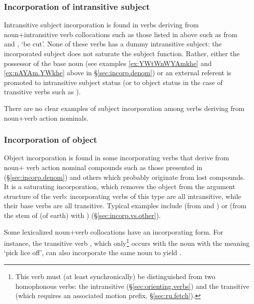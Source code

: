 \subsubsection{Incorporation of intransitive subject} \label{sec:incorp.S}
Intransitive subject incorporation is found in verbs deriving from noun+intransitive verb collocations such as those listed in  above such as  from  and , `be cut'. None of these verbs has a dummy intransitive subject: the incorporated subject does not saturate the subject function. Rather, either the possessor of the base noun (see examples  \ref{ex:YWtWnWYAmkhe} and \ref{ex:nAYAm.YWkhe} above in §\ref{sec:incorp.denom}) or an external referent is promoted to intransitive subject status (or to object status in the case of transitive verbs such as ).

There are no clear examples of subject incorporation among verbs deriving from noun+verb action nominals.

\subsubsection{Incorporation of object} \label{sec:incorp.O}
Object incorporation is found in some incorporating verbs that derive from noun+ verb action nominal compounds such as those presented in  (§\ref{sec:incorp.denom}) and others which probably originate from lost compounds. It is a saturating incorporation, which removes the object from the argument structure of the verb: incorporating verbs of this type are all intransitive, while their base verbs are all transitive. Typical examples include   (from  and	) or   (from the stem of  (of earth) with ) (§\ref{sec:incorp.vs.other}).


Some lexicalized noun+verb collocations have an incorporating form. For instance, the transitive verb , which only\footnote{This verb must (at least synchronically) be distinguished from two homophonous verbs: the intransitive  (§\ref{sec:orienting.verbs}) and the transitive  (which requires an associated motion prefix, §\ref{sec:ru.fetch}). } occurs with the noun  with the meaning `pick lice off', can also incorporate the same noun to yield .


